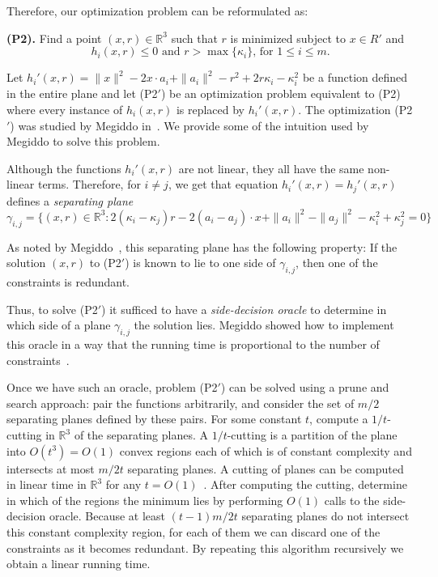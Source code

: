 \documentclass[a4paper]{article}
\newcommand{\reg}{\ensuremath{R'}}
\begin{document}
Therefore, our optimization problem can be reformulated as:

\textbf{(P2).} Find a point $(x,r)\in \mathbb{R}^3$ such that $r$ is minimized subject to $x\in \reg$ and 
$$h_i(x, r) \leq 0 \text{ and  $r > \max\{\kappa_i\}$, for $1\leq i \leq m$}.$$

Let $h_i'(x,r) = \|x\|^2 - 2x\cdot a_i + \|a_i\|^2  - r^2 + 2r\kappa_i - \kappa_i^2$ be a function defined in the entire plane and let (P2$'$) be an optimization problem equivalent to (P2) where every instance of $h_i(x,r)$ is replaced by $h_i'(x,r)$.
The optimization (P2$'$) was studied by Megiddo in~\cite{megiddo1989ball}. We provide some of the intuition used by Megiddo to solve this problem.

Although the functions $h_i'(x,r)$ are not linear, they all have the same non-linear terms. Therefore, for $i\neq j$, we get that equation
$h_i'(x,r) = h_j'(x, r)$ defines a \emph{separating plane}
$$\gamma_{i,j} = \{(x, r) \in \mathbb{R}^3:  2( \kappa_i - \kappa_j) r - 2 (a_i - a_j) \cdot x + \|a_i\|^2 - \|a_j\|^2 - \kappa_i^2 + \kappa_j^2 = 0\}$$

As noted by Megiddo~\cite{megiddo1989ball}, this separating plane has the following property:
If the solution $(x, r)$ to (P2$'$) is known to lie to one side of $\gamma_{i,j}$, then one of the constraints is redundant. 

Thus, to solve (P2$'$) it sufficed to have a \emph{side-decision oracle} to determine in which side of a plane $\gamma_{i,j}$ the solution lies. Megiddo showed how to implement this oracle in a way that the running time is proportional to the number of constraints~\cite{megiddo1989ball}.

Once we have such an oracle, problem (P2$'$) can be solved using a prune and search approach: pair the functions arbitrarily, and consider the set of $m/2$ separating planes defined by these pairs. For some constant $t$, compute a $1/t$-cutting in $\mathbb{R}^3$ of the separating planes.
A $1/t$-cutting is a partition of the plane into $O(t^3) = O(1)$ convex regions each of which is of constant complexity and intersects at most $m/2t$ separating planes.
A cutting of planes can be computed in linear time in $\mathbb{R}^3$ for any $t = O(1)$~\cite{matousekCuttings}.
After computing the cutting, determine in which of the regions the minimum lies by performing $O(1)$ calls to the side-decision oracle. 
Because at least $(t-1)m/2t$ separating planes do not intersect this constant complexity region, for each of them we can discard one of the constraints as it becomes redundant. By repeating this algorithm recursively we obtain a linear running time.
\end{document}
